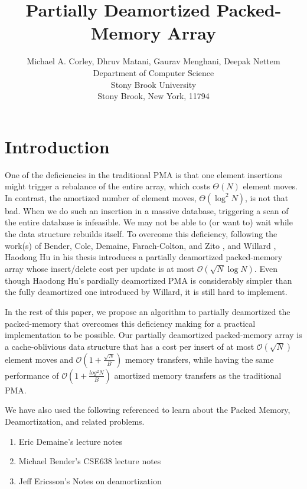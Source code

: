 \documentclass[10pt]{article}
\title{Partially Deamortized Packed-Memory Array}
\author{Michael A. Corley, Dhruv Matani, Gaurav Menghani, Deepak Nettem \\
        Department of Computer Science \\
        Stony Brook University \\
        Stony Brook, New York, 11794}
\date{}
\begin{document}
\maketitle
\bigskip

\clearpage

\section{Introduction}

One of the deficiencies in the traditional PMA is that one element
insertions might trigger a rebalance of the entire array, which costs
$\Theta(N)$ element moves. In contrast, the amortized number of
element moves, $\Theta(\log^2{N})$, is not that bad. When we do such
an insertion in a massive database, triggering a scan of the entire
database is infeasible. We may not be able to (or want to) wait while
the data structure rebuilds itself. To overcome this deficiency,
following the work(s) of Bender, Cole, Demaine, Farach-Colton, and
Zito \cite{2-simplified-algorithms}, and Willard \cite{willard},
Haodong Hu in his thesis \cite{haodong-thesis, adaptive-pma}
introduces a partially deamortized packed-memory array whose
insert/delete cost per update is at most
$\mathcal{O}({\sqrt{N}\log{N}})$.  Even though Haodong Hu's pardially
deamortized PMA is considerably simpler than the fully deamortized one
introduced by Willard, it is still hard to implement.

In the rest of this paper, we propose an algorithm to partially
deamortized the packed-memory that overcomes this deficiency making
for a practical implementation to be possible. Our partially
deamortized packed-memory array is a cache-oblivious data structure
that has a cost per insert of at most $\mathcal{O}(\sqrt{N})$ element
moves and $\mathcal{O}(1+ \frac{\sqrt{N}}{B})$ memory transfers, while having
the same performance of $\mathcal{O}(1+\frac{log^2{N}}{B})$ amortized memory
transfers as the traditional PMA.

We have also used the following referenced to learn about the Packed Memory, Deamortization, and related problems.

\begin{enumerate}
\item Eric Demaine's lecture notes \cite{demaine-lecture-notes}
\item Michael Bender's CSE638 lecture notes
\item Jeff Ericsson's Notes on deamortization \cite{jeffe-lecture-notes}
\end{enumerate}
\end{document}
